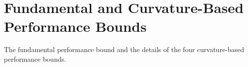 \documentclass[letterpaper, 10 pt, conference]{ieeeconf}
\newtheorem{proposition}{Proposition}
\begin{document}





\section{Fundamental and Curvature-Based Performance Bounds}
\label{Sec:LiteratureReview}

The fundamental performance bound and the details of the four curvature-based performance bounds. 

\end{document}
